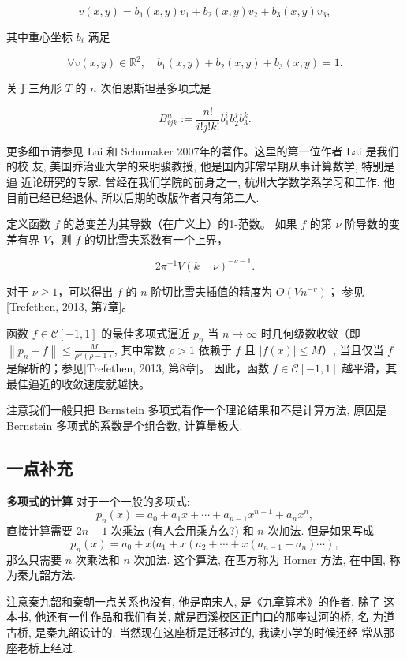 \documentclass[a4paper]{ctexart}
\begin{document}
{\[ v(x, y) = b_{1}(x, y) v_{1} + b_{2}(x, y) v_{2} + b_{3}(x, y) v_{3}, \]

其中重心坐标 \( b_{i} \) 满足

\[ \forall v(x, y) \in \mathbb{R}^2, \quad b_1(x, y) + b_2(x, y) + b_3(x, y) = 1. \]

关于三角形 \( T \) 的 \( n \) 次伯恩斯坦基多项式是

\[ B_{i j k}^{n} := \frac{n!}{i! j! k!} b_{1}^{i} b_{2}^{j} b_{3}^{k}. \]

更多细节请参见 Lai 和 Schumaker 2007年的著作。这里的第一位作者 Lai 是我们的校
友, 美国乔治亚大学的来明骏教授, 他是国内非常早期从事计算数学, 特别是逼
近论研究的专家. 曾经在我们学院的前身之一, 杭州大学数学系学习和工作. 他
目前已经已经退休, 所以后期的改版作者只有第二人. 

 定义函数 \( f \) 的总变差为其导数（在广义上）的1-范数。
如果 \( f \) 的第 \( \nu \) 阶导数的变差有界 \( V \)，则 \( f \) 的切比雪夫系数有一个上界，

\[ 2\pi^{-1} V(k-\nu)^{-\nu-1}. \]

对于 \( \nu \geq 1 \)，可以得出 \( f \) 的 \( n \) 阶切比雪夫插值的精度为 \( O\left(V n^{-v}\right) \)；
参见[Trefethen, 2013, 第7章]。

 函数 \( f \in \mathcal{C}[-1,1] \) 的最佳多项式逼近 \( p_{n} \) 当 \( n \rightarrow \infty \) 
时几何级数收敛（即 \( \left\|p_{n}-f\right\| \leq \frac{M}{\rho^{n}(\rho-1)} \), 
其中常数 \( \rho > 1 \) 依赖于 \( f \) 且 \( |f(x)| \leq M \)）, 
当且仅当 \( f \) 是解析的；参见[Trefethen, 2013, 第8章]。
因此，函数 \( f \in \mathcal{C}[-1,1] \) 越平滑，其最佳逼近的收敛速度就越快。

注意我们一般只把 Bernstein 多项式看作一个理论结果和不是计算方法, 原因是 Bernstein 多项式的系数是个组合数, 
计算量极大.

\subsection*{一点补充}

{\bf 多项式的计算} 对于一个一般的多项式:
$$
p_n(x) = a_0 + a_1 x + \cdots + a_{n - 1} x^{n - 1} + a_n x^n, 
$$
直接计算需要 $2n - 1$ 次乘法 (有人会用乘方么?) 和 $n$ 次加法. 但是如果写成
$$
p_n(x) = a_0 + x(a_1 + x(a_2 + \cdots + x(a_{n - 1} + a_n) \cdots ),
$$
那么只需要 $n$ 次乘法和 $n$ 次加法. 这个算法, 在西方称为 Horner 方法,
在中国, 称为秦九韶方法.

注意秦九韶和秦朝一点关系也没有, 他是南宋人, 是《九章算术》的作者. 除了
这本书, 他还有一件作品和我们有关, 就是西溪校区正门口的那座过河的桥, 名
为道古桥, 是秦九韶设计的. 当然现在这座桥是迁移过的, 我读小学的时候还经
常从那座老桥上经过.

}
\end{document}
